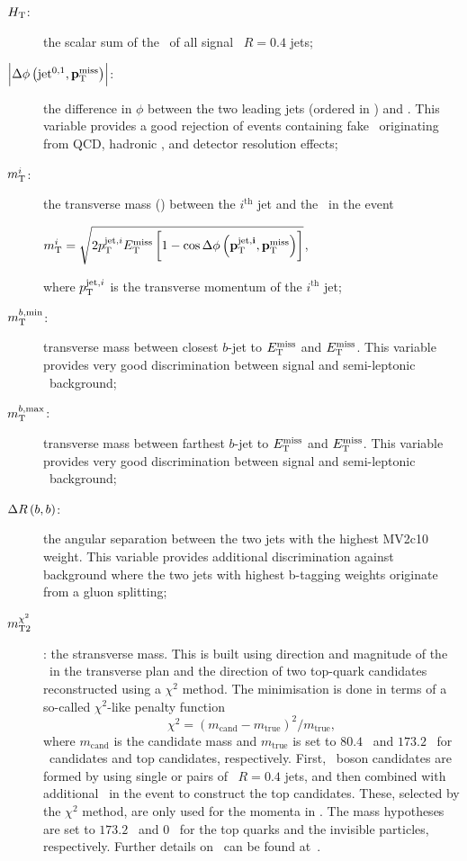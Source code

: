 			\begin{description}
				\item[\boldmath $H_{\mathrm{T}}$:] the scalar sum of the \pt\ of all signal \antikt\ $R=0.4$ jets;

				\item[$\left|\Delta\phi\left(\mathrm{jet}^{0,1},\mathbf{p}_\mathrm{T}^\mathrm{miss}\right)\right|$:] the difference in $\phi$ between the two leading jets (ordered in \pt) and \ptmiss. This variable provides a good rejection of events containing fake \met\ originating from \ac{QCD}, hadronic \ttbar, and detector resolution effects;

				\item[\boldmath $m_{\mathrm{T}}^{i}$:] the transverse mass (\mt) between the $i^{\mathrm{th}}$ jet and the \met\ in the event\\
				\begin{center}
					$\mtjetimet = \sqrt{2\ptjeti\met\left[1-\cos{\Delta\phi\left(\mathrm{\mathbf{\ptjeti}},\ptmiss\right)}\right]}$,
				\end{center}
				where $p_{\mathrm{T}}^{\mathrm{jet},i}$ is the transverse momentum of the $i^{\mathrm{th}}$ jet;

				\item[\boldmath $m_{\mathrm{T}}^{b,\mathrm{min}}$:] transverse mass between closest $b$-jet to $E_{\mathrm{T}}^{\mathrm{miss}}$ and $E_{\mathrm{T}}^{\mathrm{miss}}$. This variable provides very good discrimination between signal and semi-leptonic \ttbar\ background;

				\item[\boldmath $m_{\mathrm{T}}^{b,\mathrm{max}}$:] transverse mass between farthest $b$-jet to $E_{\mathrm{T}}^{\mathrm{miss}}$ and $E_{\mathrm{T}}^{\mathrm{miss}}$. This variable provides very good discrimination between signal and semi-leptonic \ttbar\ background;
												
				\item[\boldmath $\Delta R\left(b,b\right)$:] the angular separation between the two jets with the highest MV2c10 weight. This variable provides additional discrimination against background where the two jets with highest b-tagging weights originate from a gluon splitting;

				\item[\boldmath $m_{\mathrm{T2}}^{\chi^2}$]: the stransverse mass. This is built using direction and magnitude of the \ptmiss\ in the transverse plan and the direction of two top-quark candidates reconstructed using a $\chi^2$ method. The minimisation is done in terms of a so-called $\chi^2$-like penalty function $$\chi^2 = \left(m_{\mathrm{cand}} - m_{\mathrm{true}}\right)^2 / m_{\mathrm{true}},$$ \noindent where $m_{\mathrm{cand}}$ is the candidate mass and $m_{\mathrm{true}}$ is set to $80.4$ \GeV\ and $173.2$ \GeV\ for \Wboson\ candidates and top candidates, respectively. First, \Wboson\ boson candidates are formed by using single or pairs of \antikt\ $R = 0.4$ jets, and then combined with additional \bjs\ in the event to construct the top candidates. These, selected by the $\chi^2$ method, are only used for the momenta in \mttwo. The mass hypotheses are set to $173.2$ \gev\ and $0$ \gev\ for the top quarks and the invisible particles, respectively.	Further details on \mttwo\ can be found at~\cite{Barr:2003rg, LESTER199999}.

			\end{description}

